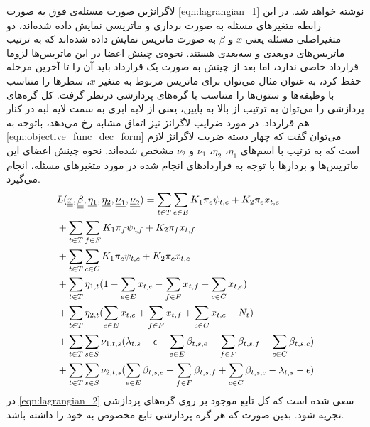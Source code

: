 		لاگرانژین صورت مسئله‌ی فوق به صورت \cref{eqn:lagrangian_1} نوشته خواهد شد. در این رابطه متغیرهای مسئله به صورت برداری و ماتریسی نمایش داده شده‌اند، دو متغیراصلی مسئله یعنی $x$ و $\beta$ به صورت ماتریس نمایش داده شده‌اند که به ترتیب ماتریس‌های دوبعدی و سه‌بعدی هستند. نحوه‌ی چینش اعضا در این ماتریس‌ها لزوما قرارداد خاصی ندارد، اما بعد از چینش به صورت یک قرارداد باید آن را تا آخرین مرحله حفظ کرد، به عنوان مثال می‌توان برای ماتریس مربوط به متغیر $x$، سطرها را متناسب با وظیفه‌ها و ستون‌ها را متناسب با گره‌های پردازشی درنظر گرفت. کل گره‌های پردازشی را می‌توان به ترتیب از بالا به پایین، یعنی از لایه ابری به سمت لایه لبه در کنار هم قرارداد. در مورد ضرایب لاگرانژ نیز اتفاق مشابه رخ می‌دهد، باتوجه به  \cref{eqn:objective_func_dec_form} می‌توان گفت که چهار دسته ضریب لاگرانژ لازم است که به ترتیب با اسم‌های $\eta_1$، $\eta_2$، $\nu_1$ و $\nu_2$ مشخص شده‌اند. نحوه چینش اعضای این ماتریس‌ها و بردارها با توجه به قراردادهای انجام شده در مورد متغیرهای مسئله، انجام می‌گیرد. 
		\begin{align}\label{eqn:lagrangian_1}
			&L(\underline{\underline x}, \underline{\underline \beta}, \underline {\eta_1}, \underline {\eta_2}, \underline{\underline \nu_1}, \underline{\underline \nu_2}) = \sum_{t \in T}\sum_{e \in E} K_1\pi_e\psi_{t,e}+K_2\pi_ex_{t,e} \notag \\
			&+ \sum_{t \in T}\sum_{f \in F} K_1\pi_f\psi_{t,f}+K_2\pi_fx_{t,f} \notag \\
			&+ \sum_{t \in T}\sum_{c \in C} K_1\pi_c\psi_{t,c}+K_2\pi_cx_{t,c} \notag \\
			&+ \sum_{t \in T  }{\eta_{1,t}(1-\sum_{e \in E}x_{t,e} - \sum_{f \in F}x_{t,f} - \sum_{c \in C}x_{t,c})} \notag \\
			&+ \sum_{t \in T}{\eta_{2,t}(\sum_{e \in E}x_{t,e} + \sum_{f \in F}x_{t,f} + \sum_{c \in C}x_{t,c}-N_t)} \notag \\
			&+ \sum_{t \in T}\sum_{s \in S}{\nu_{1,t,s}(\lambda_{t,s} - \epsilon - \sum_{e \in E}\beta_{t,s,e} - \sum_{f \in F}\beta_{t,s,f} - \sum_{c \in C}\beta_{t,s,c})} \notag \\
			&+ \sum_{t \in T}\sum_{s \in S}{\nu_{2,t,s}(\sum_{e \in E}\beta_{t,s,e} + \sum_{f \in F}\beta_{t,s,f} + \sum_{c \in C}\beta_{t,s,c} -\lambda_{t,s} - \epsilon)}
 		\end{align}
	در \cref{eqn:lagrangian_2} سعی شده است که کل تابع موجود بر روی گره‌های پردازشی تجزیه شود. بدین صورت که هر گره پردازشی تابع مخصوص به خود را داشته باشد.
